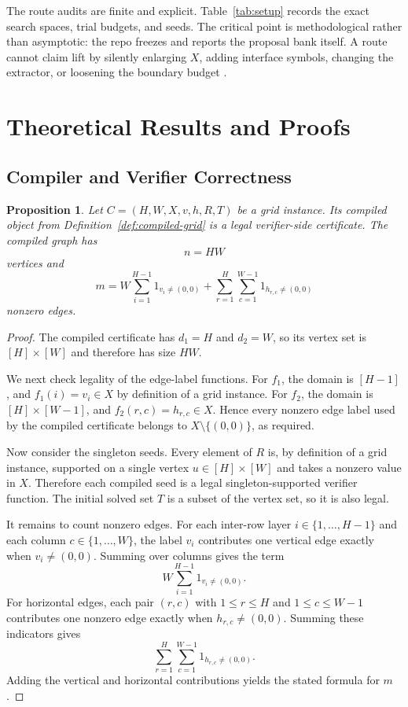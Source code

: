 \documentclass[11pt]{article}
\newtheorem{proposition}[theorem]{Proposition}
\theoremstyle{definition}
\begin{document}
The route audits are finite and explicit. Table~\ref{tab:setup} records the exact search spaces, trial budgets, and seeds. The critical point is methodological rather than asymptotic: the repo freezes and reports the proposal bank itself. A route cannot claim lift by silently enlarging $X$, adding interface symbols, changing the extractor, or loosening the boundary budget \citep{archivara_benchmark_report,archivara_complexity_frontier}.

\section{Theoretical Results and Proofs}
\label{sec:theory}

\subsection{Compiler and Verifier Correctness}

\begin{proposition}
\label{prop:compiler}
Let $C=(H,W,X,v,h,R,T)$ be a grid instance. Its compiled object from Definition~\ref{def:compiled-grid} is a legal verifier-side certificate. The compiled graph has
\[
n=HW
\]
vertices and
\[
m=W\sum_{i=1}^{H-1}1_{v_i\neq (0,0)}+\sum_{r=1}^{H}\sum_{c=1}^{W-1}1_{h_{r,c}\neq (0,0)}
\]
nonzero edges.
\end{proposition}

\begin{proof}
The compiled certificate has $d_1=H$ and $d_2=W$, so its vertex set is $[H]\times [W]$ and therefore has size $HW$.

We next check legality of the edge-label functions. For $f_1$, the domain is $[H-1]$, and $f_1(i)=v_i\in X$ by definition of a grid instance. For $f_2$, the domain is $[H]\times [W-1]$, and $f_2(r,c)=h_{r,c}\in X$. Hence every nonzero edge label used by the compiled certificate belongs to $X\setminus\{(0,0)\}$, as required.

Now consider the singleton seeds. Every element of $R$ is, by definition of a grid instance, supported on a single vertex $u\in [H]\times [W]$ and takes a nonzero value in $X$. Therefore each compiled seed is a legal singleton-supported verifier function. The initial solved set $T$ is a subset of the vertex set, so it is also legal.

It remains to count nonzero edges. For each inter-row layer $i\in\{1,\dots,H-1\}$ and each column $c\in\{1,\dots,W\}$, the label $v_i$ contributes one vertical edge exactly when $v_i\neq (0,0)$. Summing over columns gives the term
\[
W\sum_{i=1}^{H-1}1_{v_i\neq (0,0)}.
\]
For horizontal edges, each pair $(r,c)$ with $1\leq r\leq H$ and $1\leq c\leq W-1$ contributes one nonzero edge exactly when $h_{r,c}\neq (0,0)$. Summing these indicators gives
\[
\sum_{r=1}^{H}\sum_{c=1}^{W-1}1_{h_{r,c}\neq (0,0)}.
\]
Adding the vertical and horizontal contributions yields the stated formula for $m$.
\end{proof}
\end{document}
